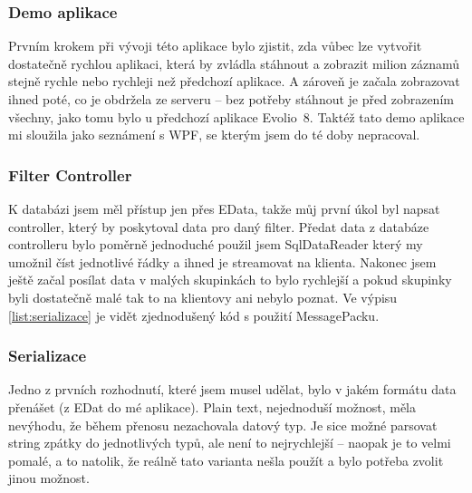 \documentclass[czech,bachelorpractice,dept460,male,csharp]{diploma}
\newcommand{\EvolioEight}{Evolio~8}
\newcommand{\EData}{EData}
\begin{document}
		\subsubsection{Demo aplikace}
			Prvním krokem při vývoji této aplikace bylo zjistit, zda vůbec lze vytvořit dostatečně rychlou aplikaci, která by zvládla stáhnout a zobrazit milion záznamů stejně rychle nebo rychleji než předchozí aplikace. A zároveň je začala zobrazovat ihned poté, co je obdržela ze serveru – bez potřeby stáhnout je před zobrazením všechny, jako tomu bylo u předchozí aplikace {\EvolioEight}.
			Taktéž tato demo aplikace mi sloužila jako seznámení s WPF, se kterým jsem do té doby nepracoval.


		\subsubsection{Filter Controller}
			K databázi jsem měl přístup jen přes {\EData}, takže můj první úkol byl napsat controller, který by poskytoval data pro daný filter. Předat data z databáze controlleru bylo poměrně jednoduché použil jsem SqlDataReader který my umožnil číst jednotlivé řádky a ihned je streamovat na klienta. Nakonec jsem ještě začal posílat data v malých skupinkách to bylo rychlejší a pokud skupinky byli dostatečně malé tak to na klientovy ani nebylo poznat.
			Ve výpisu \ref{list:serializace} je vidět zjednodušený kód s použití MessagePacku.
			
		\subsubsection{Serializace}
			Jedno z prvních rozhodnutí, které jsem musel udělat, bylo v jakém formátu data přenášet (z EDat do mé aplikace). Plain text, nejednoduší možnost, měla nevýhodu, že během přenosu nezachovala datový typ. Je sice možné parsovat string zpátky do jednotlivých typů, ale není to nejrychlejší -- naopak je to velmi pomalé, a to natolik, že reálně tato varianta nešla použít a bylo potřeba zvolit jinou možnost.
			
\end{document}
